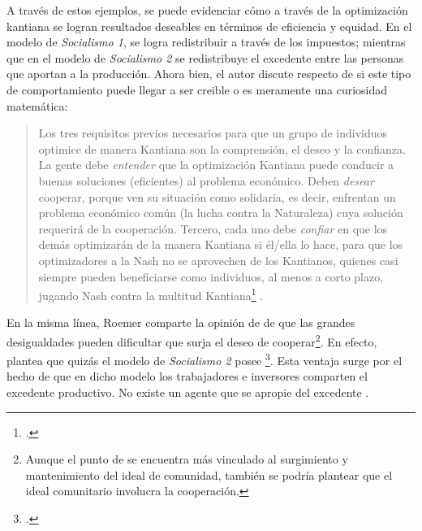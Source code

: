 A través de estos ejemplos, se puede evidenciar cómo a través de la optimización kantiana se logran resultados deseables en términos de eficiencia y equidad. En el modelo de \textit{Socialismo 1}, se logra redistribuir a través de los impuestos; mientras que en el modelo de \textit{Socialismo 2} se redistribuye el excedente entre las personas que aportan a la producción. Ahora bien, el autor discute respecto de si este tipo de comportamiento puede llegar a ser creible o es meramente una curiosidad matemática:

\vspace{3mm}
\begin{quote}
    Los tres requisitos previos necesarios para que un grupo de individuos optimice de manera Kantiana son la comprensión, el deseo y la confianza. La gente debe \textit{entender} que la optimización Kantiana puede conducir a buenas soluciones (eficientes) al problema económico. Deben \textit{desear} cooperar, porque ven su situación como solidaria, es decir, enfrentan un problema económico común (la lucha contra la Naturaleza) cuya solución requerirá de la cooperación. Tercero, cada uno debe \textit{confiar} en que los demás optimizarán de la manera Kantiana si él/ella lo hace, para que los optimizadores a la Nash no se aprovechen de los Kantianos, quienes casi siempre pueden beneficiarse como individuos, al menos a corto plazo, jugando Nash contra la multitud Kantiana\footnote{ \citep[p. 591]{Roemer_2021a}.} \citep[p. 591]{Roemer_2021a}.
\end{quote}
\vspace{3mm}

En la misma línea, Roemer comparte la opinión de \citet{Cohen_2014c} de que las grandes desigualdades pueden dificultar que surja el deseo de cooperar\footnote{Aunque el punto de \citet{Cohen_2014c} se encuentra más vinculado al surgimiento y mantenimiento del ideal de comunidad, también se podría plantear que el ideal comunitario involucra la cooperación.}. En efecto, \citet[p. 594]{Roemer_2021a} plantea que quizás el modelo de \textit{Socialismo 2} posee \footnote{ \citet[p. 594]{Roemer_2021a}.}. Esta ventaja surge por el hecho de que en dicho modelo los trabajadores e inversores comparten el excedente productivo. No existe un agente que se apropie del excedente . 

